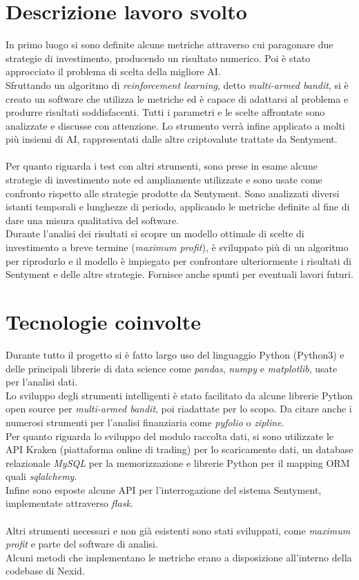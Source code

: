 \documentclass{article}
\begin{document}
\section{Descrizione lavoro svolto}
In primo luogo si sono definite alcune metriche attraverso cui paragonare due strategie di investimento, producendo un risultato numerico. Poi è stato approcciato il problema di scelta della migliore AI.\\ Sfruttando un algoritmo di \textit{reinforcement learning}, detto \textit{multi-armed bandit}, si è creato un software che utilizza le metriche ed è capace di adattarsi al problema e produrre risultati soddisfacenti. Tutti i parametri e le scelte affrontate sono analizzate e discusse con attenzione. Lo strumento verrà infine applicato a molti più insiemi di AI, rappresentati dalle altre criptovalute trattate da Sentyment.\\~\\ Per quanto riguarda i test con altri strumenti, sono prese in esame alcune strategie di investimento note ed ampliamente utilizzate e sono usate come confronto rispetto alle strategie prodotte da Sentyment. Sono analizzati diversi istanti temporali e lunghezze di periodo, applicando le metriche definite al fine di dare una misura qualitativa del software.\\ Durante l'analisi dei risultati si scopre un modello ottimale di scelte di investimento a breve termine (\textit{maximum profit}), è sviluppato più di un algoritmo per riprodurlo e il modello è impiegato per confrontare ulteriormente i risultati di Sentyment e delle altre strategie. Fornisce anche spunti per eventuali lavori futuri.

\section{Tecnologie coinvolte}
Durante tutto il progetto si è fatto largo uso del linguaggio Python (Python3) e delle principali librerie di data science come \textit{pandas}, \textit{numpy} e \textit{matplotlib}, usate per l'analisi dati. \\ Lo sviluppo degli strumenti intelligenti è stato facilitato da alcune librerie Python open source per \textit{multi-armed bandit}, poi riadattate per lo scopo. Da citare anche i numerosi strumenti per l'analisi finanziaria come \textit{pyfolio} o \textit{zipline}.\\ Per quanto riguarda lo sviluppo del modulo raccolta dati, si sono utilizzate le API Kraken (piattaforma online di trading) per lo scaricamento dati, un database relazionale \textit{MySQL} per la memorizzazione e librerie Python per il mapping ORM quali \textit{sqlalchemy}. \\ Infine sono esposte alcune API per l'interrogazione del sistema Sentyment, implementate attraverso \textit{flask}.\\~\\ Altri strumenti necessari e non già esistenti sono stati sviluppati, come \textit{maximum profit} e parte del software di analisi.\\ Alcuni metodi che implementano le metriche erano a disposizione all'interno della codebase di Nexid.
\end{document}
